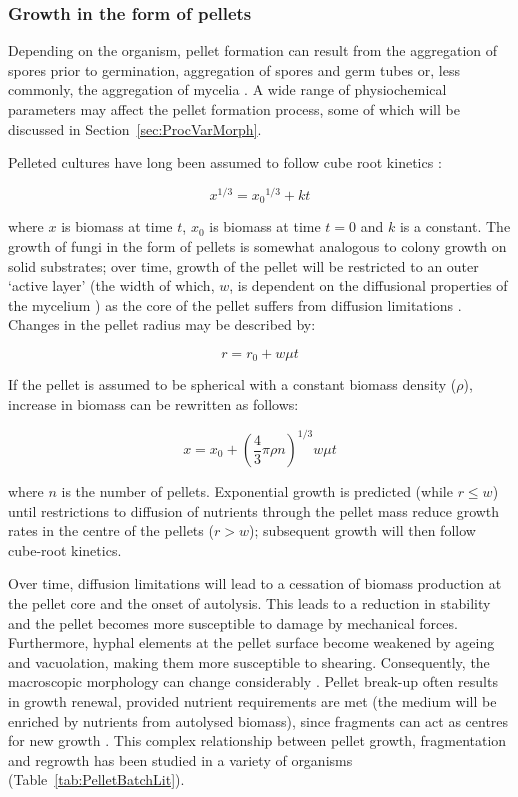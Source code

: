 \subsubsection{Growth in the form of pellets}

Depending on the organism, pellet formation can result from the aggregation of spores prior to germination, aggregation of spores and germ tubes or, less commonly, the aggregation of mycelia \cite{prosser1995}. A wide range of physiochemical parameters may affect the pellet formation process, some of which will be discussed in Section~\ref{sec:ProcVarMorph}.

Pelleted cultures have long been assumed to follow cube root kinetics \cite{emerson1950,marshall1960}:

\begin{equation}
	x^{1/3} = {x_0}^{1/3} + kt
\end{equation}

\noindent where $x$ is biomass at time $t$, $x_0$ is biomass at time $t=0$ and $k$ is a constant.  The growth of fungi in the form of pellets is somewhat analogous to colony growth on solid substrates; over time, growth of the pellet will be restricted to an outer \lq active layer' (the width of which, $w$, is dependent on the diffusional properties of the mycelium \cite{prosser1995}) as the core of the pellet suffers from diffusion limitations \cite{pirt1966}. Changes in the pellet radius may be described by:

\begin{equation}
	r = r_0 + w \mu t
\end{equation}

\noindent If the pellet is assumed to be spherical with a constant biomass density ($\rho$), increase in biomass can be rewritten as follows:

\begin{equation}
	x = x_0 + \left( \frac{4}{3} \pi \rho n \right )^{1/3} w \mu t
\end{equation}

\noindent where $n$ is the number of pellets. Exponential growth is predicted (while $r \leq w$) until restrictions to diffusion of nutrients through the pellet mass reduce growth rates in the centre of the pellets ($r > w$); subsequent growth will then follow cube-root kinetics.

Over time, diffusion limitations will lead to a cessation of biomass production at the pellet core and the onset of autolysis. This leads to a reduction in stability and the pellet becomes more susceptible to damage by mechanical forces. Furthermore, hyphal elements at the pellet surface become weakened by ageing and vacuolation, making them more susceptible to shearing. Consequently, the macroscopic morphology can change considerably \cite{paul1999}. Pellet break-up often results in growth renewal, provided nutrient requirements are met (the medium will be enriched by nutrients from autolysed biomass), since fragments can act as centres for new growth \cite{papagiannireview}. This complex relationship between pellet growth, fragmentation and regrowth has been studied in a variety of organisms (Table~\ref{tab:PelletBatchLit}).

